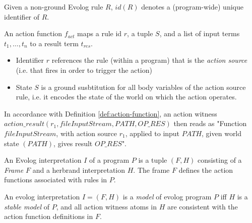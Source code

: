 \begin{definition}
\label{def:rule-id}
Given a non-ground Evolog rule $R$, $id(R)$ denotes a (program-wide) unique identifier of $R$.
\end{definition}

\begin{definition}
\label{def:action-function}
An action function $f_{act}$ maps a rule id $r$, a tuple $S$, and a list of input terms $t_1,\ldots, t_n$ to a result term $t_{res}$.
\begin{itemize}
	\item Identifier $r$ references the rule (within a program) that is the \emph{action source} (i.e. that fires in order to trigger the action)
	\item State $S$ is a ground susbtitution for all body variables of the action source rule, i.e. it encodes the state of the world on which the action operates.
\end{itemize}
\end{definition}
In accordance with Definition \ref{def:action-function}, an action witness $action\_result(r_1, fileInputStream, PATH, OP\_RES)$ then reads as "Function $fileInputStream$, with action source $r_1$, applied to input $PATH$, given world state $(PATH)$, gives result $OP\_RES$".

\begin{definition}
\label{def:evolog-interpretation}
An Evolog interpretation $I$ of a program $P$ is a tuple $(F, H)$ consisting of a \emph{Frame} $F$ and a herbrand interpretation $H$. The frame $F$ defines the action functions associated with rules in $P$.
\end{definition}

\begin{definition}
An evolog interpretation $I = (F, H)$ is a \emph{model} of evolog program $P$ iff $H$ is a \emph{stable model} of $P$, and all action witness atoms in $H$ are consistent with the action function definitions in $F$.
\end{definition}